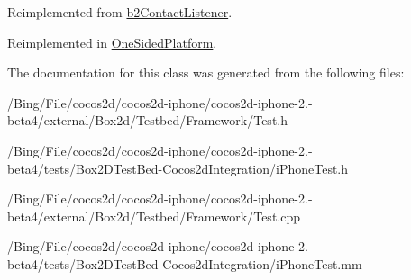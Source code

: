 Reimplemented from \hyperlink{classb2_contact_listener_a416f85eb45a1099053402b15a19a7de0}{b2\-Contact\-Listener}.



Reimplemented in \hyperlink{class_one_sided_platform_a9a2f282d5907773999658850a54b15f9}{One\-Sided\-Platform}.



The documentation for this class was generated from the following files\-:\begin{DoxyCompactItemize}
\item 
/\-Bing/\-File/cocos2d/cocos2d-\/iphone/cocos2d-\/iphone-\/2.-\/beta4/external/\-Box2d/\-Testbed/\-Framework/Test.\-h\item 
/\-Bing/\-File/cocos2d/cocos2d-\/iphone/cocos2d-\/iphone-\/2.-\/beta4/tests/\-Box2\-D\-Test\-Bed-\/\-Cocos2d\-Integration/i\-Phone\-Test.\-h\item 
/\-Bing/\-File/cocos2d/cocos2d-\/iphone/cocos2d-\/iphone-\/2.-\/beta4/external/\-Box2d/\-Testbed/\-Framework/Test.\-cpp\item 
/\-Bing/\-File/cocos2d/cocos2d-\/iphone/cocos2d-\/iphone-\/2.-\/beta4/tests/\-Box2\-D\-Test\-Bed-\/\-Cocos2d\-Integration/i\-Phone\-Test.\-mm\end{DoxyCompactItemize}
